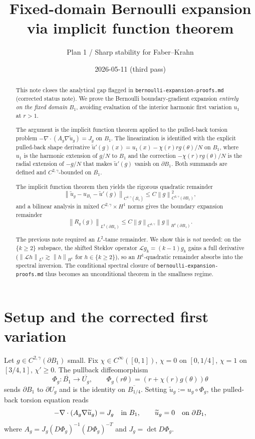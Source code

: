\documentclass[11pt]{article}
\title{Fixed-domain Bernoulli expansion via implicit function theorem}
\author{Plan 1 / Sharp stability for Faber--Krahn}
\date{2026-05-11 (third pass)}
\theoremstyle{definition}
\newcommand{\norm}[1]{\left\|#1\right\|}
\begin{document}
\maketitle

\begin{abstract}
This note closes the analytical gap flagged in
\texttt{bernoulli-expansion-proofs.md} (corrected status note). We prove the
Bernoulli boundary-gradient expansion \emph{entirely on the fixed domain}
$B_1$, avoiding evaluation of the interior harmonic first variation $u_1$ at
$r>1$.

The argument is the implicit function theorem applied to the pulled-back
torsion problem $-\nabla\cdot(A_g\nabla\widetilde u_g)=J_g$ on $B_1$. The
linearization is identified with the explicit pulled-back shape derivative
\(\widetilde u'(g)(x)=u_1(x)-\chi(r)rg(\theta)/N\) on $B_1$, where $u_1$ is the
harmonic extension of $g/N$ to $B_1$ and the correction
$-\chi(r)rg(\theta)/N$ is the radial extension of $-g/N$ that makes
$\widetilde u'(g)$ vanish on $\partial B_1$. Both summands are defined and
$C^{2,\gamma}$-bounded on $\overline{B_1}$.

The implicit function theorem then yields the rigorous quadratic remainder
\[
\norm{\widetilde u_g-u_{B_1}-\widetilde u'(g)}_{C^{2,\gamma}(\overline{B_1})}
\le C\norm{g}_{C^{2,\gamma}(\partial B_1)}^2,
\]
and a bilinear analysis in mixed $C^{2,\gamma}\times H^1$ norms gives the
boundary expansion remainder
\[
\norm{R_q(g)}_{L^2(\partial B_1)}
\le C\norm{g}_{C^{2,\gamma}}\norm{g}_{H^1(\partial B_1)}.
\]

The previous note required an $L^2$-tame remainder. We show this is
\emph{not} needed: on the $\{k\ge2\}$ subspace, the shifted Steklov
operator $\mathcal L g_k=(k-1)g_k$ gains a full derivative
($\norm{\mathcal Lh}_{L^2}\gtrsim\norm{h}_{H^1}$ for $h\in\{k\ge2\}$), so an
$H^1$-quadratic remainder absorbs into the spectral inversion. The
conditional spectral closure of \texttt{bernoulli-expansion-proofs.md} thus
becomes an unconditional theorem in the smallness regime.
\end{abstract}

\section{Setup and the corrected first variation}\label{sec:setup}

Let $g\in C^{2,\gamma}(\partial B_1)$ small. Fix $\chi\in C^\infty([0,1])$,
$\chi=0$ on $[0,1/4]$, $\chi=1$ on $[3/4,1]$, $\chi'\ge0$. The pullback
diffeomorphism
\[
\Phi_g:\overline{B_1}\to\overline{U_g},\qquad
\Phi_g(r\theta)=(r+\chi(r)g(\theta))\theta
\]
sends $\partial B_1$ to $\partial U_g$ and is the identity on
$\overline{B_{1/4}}$. Setting $\widetilde u_g:=u_g\circ\Phi_g$, the pulled-back
torsion equation reads
\begin{equation}\label{eq:pullback}
-\nabla\cdot(A_g\nabla\widetilde u_g)=J_g\quad\hbox{in }B_1,\qquad
\widetilde u_g=0\quad\hbox{on }\partial B_1,
\end{equation}
where $A_g=J_g(D\Phi_g)^{-1}(D\Phi_g)^{-T}$ and $J_g=\det D\Phi_g$.
\end{document}

